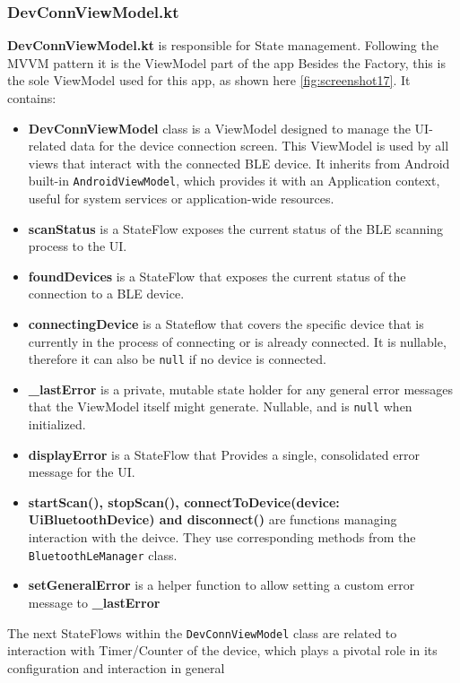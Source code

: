 \subsubsection{DevConnViewModel.kt}
\textbf{DevConnViewModel.kt} is responsible for State management. Following the \ac{MVVM} pattern it is the ViewModel part of the app Besides the Factory, this is the sole ViewModel used for this app, as shown here \ref{fig:screenshot17}. It contains:
\begin{itemize}
	\item \textbf{DevConnViewModel} class is a ViewModel designed to manage the UI-related data for the device connection screen.  This ViewModel is used by all views that interact with the connected \ac{BLE} device. It inherits from Android built-in \texttt{AndroidViewModel}, which provides it with an Application context, useful for system services or application-wide resources.
	\item \textbf{scanStatus} is a StateFlow exposes the current status of the BLE scanning process to the UI.
	\item \textbf{foundDevices} is a StateFlow that exposes the current status of the connection to a BLE device. 
	\item \textbf{connectingDevice} is a Stateflow that covers the specific device that is currently in the process of connecting or is already connected. It is nullable, therefore it can also be \texttt{null} if no device is connected.
	\item \textbf{\_lastError} is a private, mutable state holder for any general error messages that the ViewModel itself might generate. Nullable, and is \texttt{null} when initialized.
	\item  \textbf{displayError} is a StateFlow that Provides a single, consolidated error message for the UI. 
	\item \textbf{startScan(), stopScan(), connectToDevice(device: UiBluetoothDevice) and disconnect()} are functions managing interaction with the deivce. They use corresponding methods from the \texttt{BluetoothLeManager} class.
	\item \textbf{setGeneralError} is a helper function to allow setting a custom error message to \textbf{\_lastError}
\end{itemize}
The next StateFlows within the \texttt{DevConnViewModel} class are related to interaction with Timer/Counter of the device, which plays a pivotal role in its configuration and interaction in general
